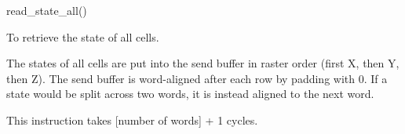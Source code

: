 

\format
read\_state\_all()

\purpose

To retrieve the state of all cells.

\description

The states of all cells are put into the send buffer in raster order (first X, then Y, then Z).
The send buffer is word-aligned after each row by padding with 0.
If a state would be split across two words, it is instead aligned to the next word.

\notes

This instruction takes [number of words] + 1 cycles.
